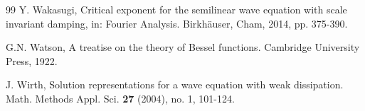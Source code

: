 \documentclass[11pt,twoside]{article}
\theoremstyle{plain}
\theoremstyle{definition}
\theoremstyle{remark}
\numberwithin{equation}{section}
\begin{document}
\begin{thebibliography}{99}
Y. Wakasugi, Critical exponent for the semilinear wave equation with scale invariant damping, in: Fourier Analysis.
Birkh\"auser, Cham, 2014, pp. 375-390.


G.N. Watson,  A treatise on the theory of Bessel functions. Cambridge University Press,
1922.

J. Wirth, Solution representations for a wave equation
with weak dissipation. Math. Methods Appl. Sci. \textbf{27} (2004), no. 1, 101-124.







\end{thebibliography}




\end{document}
